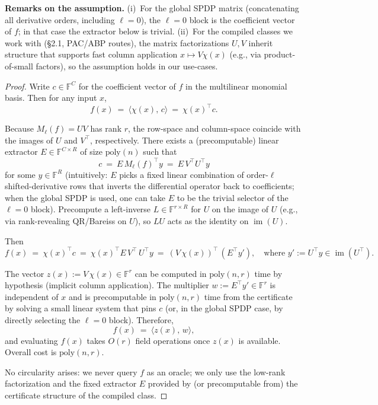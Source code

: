 \documentclass[12pt]{article}
\theoremstyle{definition}
\theoremstyle{definition}
\theoremstyle{remark}
\theoremstyle{remark}
\begin{document}
\textbf{Remarks on the assumption.}
(i)~For the global SPDP matrix (concatenating all derivative orders, including $\ell=0$), the $\ell=0$ block is the coefficient vector of $f$; in that case the extractor below is trivial.
(ii)~For the compiled classes we work with (\S2.1, PAC/ABP routes), the matrix factorizations $U,V$ inherit structure that supports fast column application $x\mapsto V\chi(x)$ (e.g., via product-of-small factors), so the assumption holds in our use-cases.

\begin{proof}
Write $c\in\mathbb{F}^C$ for the coefficient vector of $f$ in the multilinear monomial basis. Then for any input $x$,
\[
f(x) \ =\ \langle\chi(x),\,c\rangle \ =\ \chi(x)^\top c.
\]

Because $M_\ell(f) = UV$ has rank $r$, the row-space and column-space coincide with the images of $U$ and $V^\top$, respectively. There exists a (precomputable) linear extractor $E\in\mathbb{F}^{C\times R}$ of size $\mathrm{poly}(n)$ such that
\[
c \ =\ E\,M_\ell(f)^\top y \ =\ E\,V^\top U^\top y
\]
for some $y\in\mathbb{F}^R$ (intuitively: $E$ picks a fixed linear combination of order-$\ell$ shifted-derivative rows that inverts the differential operator back to coefficients; when the global SPDP is used, one can take $E$ to be the trivial selector of the $\ell=0$ block). Precompute a left-inverse $L\in\mathbb{F}^{r\times R}$ for $U$ on the image of $U$ (e.g., via rank-revealing QR/Bareiss on $U$), so $LU$ acts as the identity on $\operatorname{im}(U)$.

Then
\[
f(x) \ =\ \chi(x)^\top c \ =\ \chi(x)^\top E\,V^\top\,U^\top y \ =\ (V\,\chi(x))^\top\,(E^\top y'), \quad\text{where } y':=U^\top y\in\operatorname{im}(U^\top).
\]

The vector $z(x):=V\,\chi(x)\in\mathbb{F}^r$ can be computed in $\mathrm{poly}(n,r)$ time by hypothesis (implicit column application). The multiplier $w:=E^\top y'\in\mathbb{F}^r$ is independent of $x$ and is precomputable in $\mathrm{poly}(n,r)$ time from the certificate by solving a small linear system that pins $c$ (or, in the global SPDP case, by directly selecting the $\ell=0$ block). Therefore,
\[
f(x) \ =\ \langle z(x),\,w\rangle,
\]
and evaluating $f(x)$ takes $O(r)$ field operations once $z(x)$ is available. Overall cost is $\mathrm{poly}(n,r)$.

No circularity arises: we never query $f$ as an oracle; we only use the low-rank factorization and the fixed extractor $E$ provided by (or precomputable from) the certificate structure of the compiled class.
\end{proof}
\end{document}
